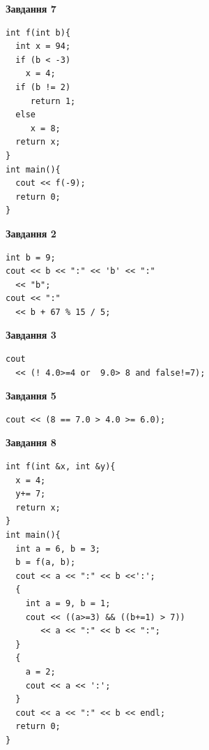 \documentclass[12pt, ukrainian]{article}
\begin{document}
{\begin {large}
\begin{minipage}[t]{7.0cm}
\begin{center}
\textbf{Завдання 7}
\end{center}
\vspace{-8mm}

\begin{verbatim}
int f(int b){
  int x = 94;
  if (b < -3)
    x = 4;
  if (b != 2)
     return 1;
  else
     x = 8;
  return x;
}
int main(){
  cout << f(-9);
  return 0;
}
\end{verbatim}

\end{minipage}
\vline \hspace{1mm}
\begin{minipage}[t]{11.0cm}

\begin{center}
\textbf{Завдання 2}
\end{center}
\vspace{-8mm}

\begin{verbatim}
int b = 9;
cout << b << ":" << 'b' << ":" 
  << "b";
cout << ":" 
  << b + 67 % 15 / 5;
\end{verbatim}



\begin{center}
\textbf{Завдання 3}
\end{center}
\vspace{-8mm}

\begin{verbatim}
cout 
  << (! 4.0>=4 or  9.0> 8 and false!=7);
\end{verbatim}



\begin{center}
\textbf{Завдання 5}
\end{center}
\vspace{-8mm}

\begin{verbatim}
cout << (8 == 7.0 > 4.0 >= 6.0);
\end{verbatim}



\begin{center}
\textbf{Завдання 8}
\end{center}
\vspace{-8mm}

\begin{verbatim}
int f(int &x, int &y){
  x = 4;
  y+= 7;
  return x;
}
int main(){
  int a = 6, b = 3;
  b = f(a, b);
  cout << a << ":" << b <<':';
  {
    int a = 9, b = 1;
    cout << ((a>=3) && ((b+=1) > 7))
       << a << ":" << b << ":";
  }
  {
    a = 2;
    cout << a << ':';
  }
  cout << a << ":" << b << endl;
  return 0;
}
\end{verbatim}


\end{minipage}
\end{large}}
\end{document}
